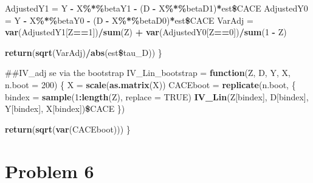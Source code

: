 \documentclass[]{article}
\newenvironment{Shaded}{\begin{snugshade}}{\end{snugshade}}
\newcommand{\KeywordTok}[1]{\textcolor[rgb]{0.13,0.29,0.53}{\textbf{#1}}}
\newcommand{\DataTypeTok}[1]{\textcolor[rgb]{0.13,0.29,0.53}{#1}}
\newcommand{\DecValTok}[1]{\textcolor[rgb]{0.00,0.00,0.81}{#1}}
\newcommand{\StringTok}[1]{\textcolor[rgb]{0.31,0.60,0.02}{#1}}
\newcommand{\OtherTok}[1]{\textcolor[rgb]{0.56,0.35,0.01}{#1}}
\newcommand{\ControlFlowTok}[1]{\textcolor[rgb]{0.13,0.29,0.53}{\textbf{#1}}}
\newcommand{\OperatorTok}[1]{\textcolor[rgb]{0.81,0.36,0.00}{\textbf{#1}}}
\newcommand{\NormalTok}[1]{#1}
\begin{document}
\begin{Shaded}
\begin{Highlighting}[]
\NormalTok{  AdjustedY1   =}\StringTok{ }\NormalTok{Y }\OperatorTok{-}\StringTok{ }\NormalTok{X}\OperatorTok{\%*\%}\NormalTok{betaY1 }\OperatorTok{-}\StringTok{ }
\StringTok{                     }\NormalTok{(D }\OperatorTok{-}\StringTok{ }\NormalTok{X}\OperatorTok{\%*\%}\NormalTok{betaD1)}\OperatorTok{*}\NormalTok{est}\OperatorTok{\$}\NormalTok{CACE}
\NormalTok{  AdjustedY0   =}\StringTok{ }\NormalTok{Y }\OperatorTok{-}\StringTok{ }\NormalTok{X}\OperatorTok{\%*\%}\NormalTok{betaY0 }\OperatorTok{-}\StringTok{ }
\StringTok{                     }\NormalTok{(D }\OperatorTok{-}\StringTok{ }\NormalTok{X}\OperatorTok{\%*\%}\NormalTok{betaD0)}\OperatorTok{*}\NormalTok{est}\OperatorTok{\$}\NormalTok{CACE}
\NormalTok{  VarAdj       =}\StringTok{ }\KeywordTok{var}\NormalTok{(AdjustedY1[Z}\OperatorTok{==}\DecValTok{1}\NormalTok{])}\OperatorTok{/}\KeywordTok{sum}\NormalTok{(Z) }\OperatorTok{+}\StringTok{ }
\StringTok{                     }\KeywordTok{var}\NormalTok{(AdjustedY0[Z}\OperatorTok{==}\DecValTok{0}\NormalTok{])}\OperatorTok{/}\KeywordTok{sum}\NormalTok{(}\DecValTok{1} \OperatorTok{-}\StringTok{ }\NormalTok{Z)}
  
  \KeywordTok{return}\NormalTok{(}\KeywordTok{sqrt}\NormalTok{(VarAdj)}\OperatorTok{/}\KeywordTok{abs}\NormalTok{(est}\OperatorTok{\$}\NormalTok{tau_D))}
\NormalTok{\}}

\NormalTok{##IV_adj se via the bootstrap}
\NormalTok{IV_Lin_bootstrap =}\StringTok{ }\ControlFlowTok{function}\NormalTok{(Z, D, Y, X, }\DataTypeTok{n.boot =} \DecValTok{200}\NormalTok{)}
\NormalTok{\{}
\NormalTok{  X         =}\StringTok{ }\KeywordTok{scale}\NormalTok{(}\KeywordTok{as.matrix}\NormalTok{(X))}
\NormalTok{  CACEboot  =}\StringTok{ }\KeywordTok{replicate}\NormalTok{(n.boot,}
\NormalTok{                        \{}
\NormalTok{                          bindex =}\StringTok{ }\KeywordTok{sample}\NormalTok{(}\DecValTok{1}\OperatorTok{:}\KeywordTok{length}\NormalTok{(Z), }\DataTypeTok{replace =} \OtherTok{TRUE}\NormalTok{)}
                          \KeywordTok{IV_Lin}\NormalTok{(Z[bindex], D[bindex], Y[bindex], X[bindex])}\OperatorTok{\$}\NormalTok{CACE}
\NormalTok{                        \})}
  
  \KeywordTok{return}\NormalTok{(}\KeywordTok{sqrt}\NormalTok{(}\KeywordTok{var}\NormalTok{(CACEboot)))}
\NormalTok{\}}
\end{Highlighting}
\end{Shaded}

\section*{Problem 6}
\end{document}
